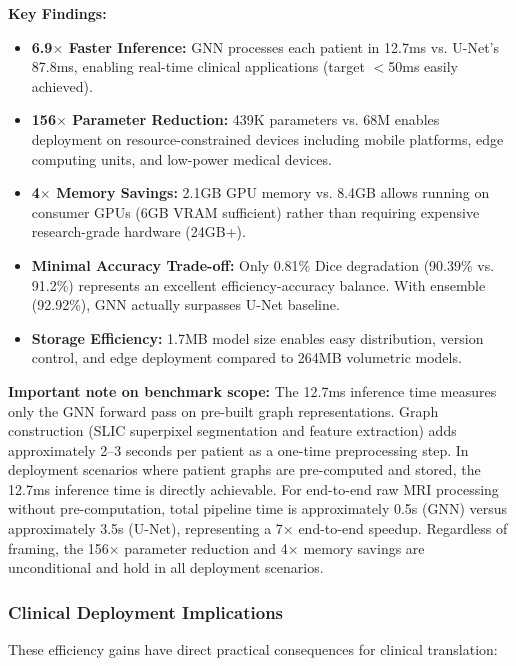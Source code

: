 \textbf{Key Findings:}
\begin{itemize}
    \item \textbf{6.9$\times$ Faster Inference:} GNN processes each patient in 12.7ms vs. U-Net's 87.8ms, enabling real-time clinical applications (target $<$50ms easily achieved).

    \item \textbf{156$\times$ Parameter Reduction:} 439K parameters vs. 68M enables deployment on resource-constrained devices including mobile platforms, edge computing units, and low-power medical devices.

    \item \textbf{4$\times$ Memory Savings:} 2.1GB GPU memory vs. 8.4GB allows running on consumer GPUs (6GB VRAM sufficient) rather than requiring expensive research-grade hardware (24GB+).

    \item \textbf{Minimal Accuracy Trade-off:} Only 0.81\% Dice degradation (90.39\% vs. 91.2\%) represents an excellent efficiency-accuracy balance. With ensemble (92.92\%), GNN actually surpasses U-Net baseline.

    \item \textbf{Storage Efficiency:} 1.7MB model size enables easy distribution, version control, and edge deployment compared to 264MB volumetric models.
\end{itemize}

\textbf{Important note on benchmark scope:} The 12.7ms inference time measures only the GNN forward pass on pre-built graph representations. Graph construction (SLIC superpixel segmentation and feature extraction) adds approximately 2--3 seconds per patient as a one-time preprocessing step. In deployment scenarios where patient graphs are pre-computed and stored, the 12.7ms inference time is directly achievable. For end-to-end raw MRI processing without pre-computation, total pipeline time is approximately 0.5s (GNN) versus approximately 3.5s (U-Net), representing a 7$\times$ end-to-end speedup. Regardless of framing, the 156$\times$ parameter reduction and 4$\times$ memory savings are unconditional and hold in all deployment scenarios.

\subsubsection{Clinical Deployment Implications}

These efficiency gains have direct practical consequences for clinical translation:

